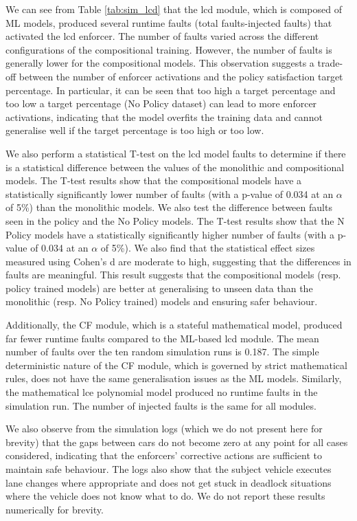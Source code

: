We can see from Table \ref{tab:sim_lcd} that the \gls{lcd} module, which is composed of ML models, produced several runtime faults (total faults-injected faults) that activated the \gls{lcd} enforcer. The number of faults varied across the different configurations of the compositional training. However, the number of faults is generally lower for the compositional models. This observation suggests a trade-off between the number of enforcer activations and the policy satisfaction target percentage. In particular, it can be seen that too high a target percentage and too low a target percentage (No Policy dataset) can lead to more enforcer activations, indicating that the model overfits the training data and cannot generalise well if the target percentage is too high or too low. 

We also perform a statistical T-test on the \gls{lcd} model faults to determine if there is a statistical difference between the values of the monolithic and compositional models. The T-test results show that the compositional models have a statistically significantly lower number of faults  (with a p-value of 0.034 at an $\alpha$ of 5\%) than the monolithic models. We also test the difference between faults seen in the policy and the No Policy models. The T-test results show that the N Policy models have a statistically significantly higher number of faults  (with a p-value of 0.034 at an $\alpha$ of 5\%). We also find that the statistical effect sizes measured using Cohen's d are moderate to high, suggesting that the differences in faults are meaningful. This result suggests that the compositional models (resp. policy trained models) are better at generalising to unseen data than the monolithic (resp. No Policy trained) models and ensuring safer behaviour.


Additionally, the CF module, which is a stateful mathematical model, produced far fewer runtime faults compared to the ML-based \gls{lcd} module. The mean number of faults over the ten random simulation runs is 0.187. The simple deterministic nature of the CF module, which is governed by strict mathematical rules, does not have the same generalisation issues as the ML models. Similarly, the mathematical \gls{lce} polynomial model produced no runtime faults in the simulation run. The number of injected faults is the same for all modules.

We also observe from the simulation logs (which we do not present here for brevity) that the gaps between cars do not become zero at any point for all cases considered, indicating that the enforcers' corrective actions are sufficient to maintain safe behaviour. The logs also show that the subject vehicle executes lane changes where appropriate and does not get stuck in deadlock situations where the vehicle does not know what to do. We do not report these results numerically for brevity.



